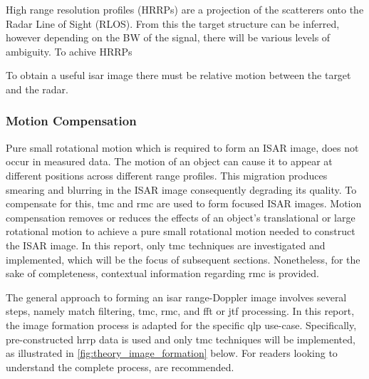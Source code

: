 \documentclass[class=report,11pt,crop=false]{standalone}
\begin{document}
    High range resolution profiles (HRRPs) are a projection of the scatterers onto the Radar Line of Sight (RLOS). From this the target structure can be inferred, however depending on the BW of the signal, there will be various levels of ambiguity. %
    To achive HRRPs
    
    To obtain a useful \gls{isar} image there must be relative motion between the target and the radar. %
    
    \subsubsection{Motion Compensation}
    Pure small rotational motion which is required to form an ISAR image, does not occur in measured data. The motion of an object can cause it to appear at different positions across different range profiles. This migration produces smearing and blurring in the ISAR image consequently degrading its quality. To compensate for this, \gls{tmc} and \gls{rmc} are used to form focused ISAR images. Motion compensation removes or reduces the effects of an object's translational or large rotational motion to achieve a pure small rotational motion needed to construct the ISAR image. In this report, only \gls{tmc} techniques are investigated and implemented, which will be the focus of subsequent sections. Nonetheless, for the sake of completeness, contextual information regarding \gls{rmc} is provided.
    
    The general approach to forming an \gls{isar} range-Doppler image involves several steps, namely match filtering, \gls{tmc}, \gls{rmc}, and \gls{fft} or \gls{jtf} processing. In this report, the image formation process is adapted for the specific \gls{qlp} use-case.  Specifically, pre-constructed \gls{hrrp} data is used and only \gls{tmc} techniques will be implemented, as illustrated in \autoref{fig:theory_image_formation} below. For readers looking to understand the complete process, \cite{ISARtextbook_Martorella,ISARtextbook_Matlab,yunus} are recommended.
    
\end{document}
